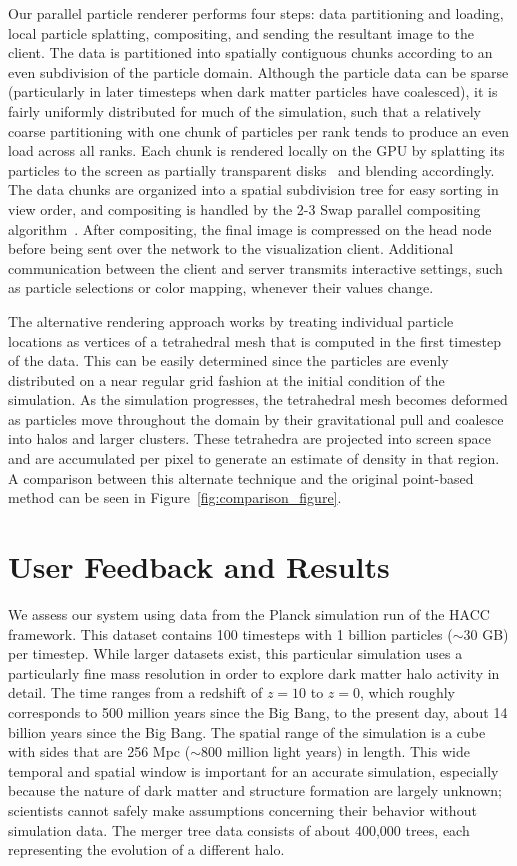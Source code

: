 Our parallel particle renderer performs four steps: data partitioning and loading, local particle splatting, compositing, and sending the resultant image to the client. The data is partitioned into spatially contiguous chunks according to an even subdivision of the particle domain. Although the particle data can be sparse (particularly in later timesteps when dark matter particles have coalesced), it is fairly uniformly distributed for much of the simulation, such that a relatively coarse partitioning with one chunk of particles per rank tends to produce an even load across all ranks. Each chunk is rendered locally on the GPU by splatting its particles to the screen as partially transparent disks~\cite{Gumhold:2003} and blending accordingly. The data chunks are organized into a spatial subdivision tree for easy sorting in view order, and compositing is handled by the 2-3 Swap parallel compositing algorithm~\cite{23swap}. After compositing, the final image is compressed on the head node before being sent over the network to the visualization client. Additional communication between the client and server transmits interactive settings, such as particle selections or color mapping, whenever their values change.

The alternative rendering approach works by treating individual particle locations as vertices of a tetrahedral mesh that is computed in the first timestep of the data. This can be easily determined since the particles are evenly distributed on a near regular grid fashion at the initial condition of the simulation. As the simulation progresses, the tetrahedral mesh becomes deformed as particles move throughout the domain by their gravitational pull and coalesce into halos and larger clusters. These tetrahedra are projected into screen space and are accumulated per pixel to generate an estimate of density in that region. A comparison between this alternate technique and the original point-based method can be seen in Figure~\ref{fig:comparison_figure}.


\section{User Feedback and Results}

We assess our system using data from the Planck simulation run of the HACC framework. This dataset contains 100 timesteps with 1 billion particles ($\sim30$ GB) per timestep. While larger datasets exist, this particular simulation uses a particularly fine mass resolution in order to explore dark matter halo activity in detail. The time ranges from a redshift of $z = 10$ to $z = 0$, which roughly corresponds to 500 million years since the Big Bang, to the present day, about 14 billion years since the Big Bang. The spatial range of the simulation is a cube with sides that are 256 Mpc ($\sim 800$ million light years) in length. This wide temporal and spatial window is important for an accurate simulation, especially because the nature of dark matter and structure formation are largely unknown; scientists cannot safely make assumptions concerning their behavior without simulation data. The merger tree data consists of about 400,000 trees, each representing the evolution of a different halo.

